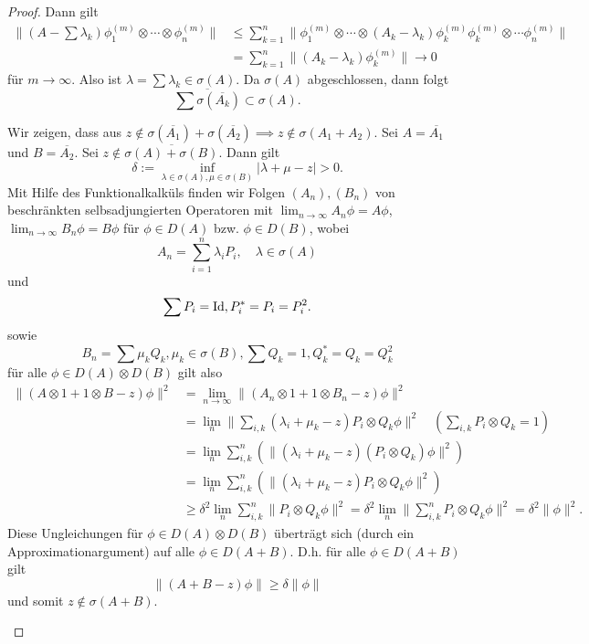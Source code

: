 \documentclass{mycourse}
\begin{document}
\begin{proof}
Dann gilt \fixme
\begin{align*}
\|(A- \sum \lambda_k)  \phi_1^{(m)} \otimes  \cdots \otimes \phi_n^{(m)}\| &\le \sum_{k=1}^n \| \phi_1^{(m)} \otimes \cdots \otimes (A_k-\lambda_k) \phi_k^{(m)} \phi_k^{(m)} \otimes \cdots \phi_n^{(m)}\|\\
&= \sum_{k=1}^n \| (A_k - \lambda_k) \phi^{(m)}_k \| \to 0
\end{align*}
für $m\to \infty$. Also ist $\lambda = \sum \lambda_k \in \sigma(A)$. Da $\sigma(A)$ abgeschlossen, dann folgt
\[
\overline{\sum \sigma (\overline{A_k})} \subset \sigma(A).
\] 
\begin{seg}[Umkehrung für $n=2$]
Wir zeigen, dass aus $z\not\in \sigma(\overline{A_1}) + \sigma(\overline{A_2}) \implies z\not\in \sigma(A_1 + A_2)$. Sei $A= \overline{A_1}$ und $B= \overline{A_2}$. Sei $z\not\in \overline{\sigma(A) + \sigma(B)}$. Dann gilt
\[
\delta := \inf_{\lambda\in \sigma(A), \mu \in \sigma(B)} |\lambda + \mu -z|>0.
\]
Mit Hilfe des Funktionalkalküls finden wir Folgen $(A_n), (B_n)$ von beschränkten selbsadjungierten Operatoren mit $\lim_{n\to \infty} A_n \phi = A \phi$, $\lim_{n\to \infty} B_n \phi = B\phi$ für $\phi \in D(A)$ bzw. $\phi \in D(B)$, wobei
\[
A_n = \sum_{i=1}^n \lambda_i P_i, \quad \lambda \in \sigma(A)
\]
und
\[
\sum P_i = \operatorname{Id}, P_i^* = P_i = P_i^2.
\]
sowie
\[
B_n = \sum \mu_k Q_k, \mu_k \in \sigma(B), \sum Q_k =1, Q_k^* = Q_k = Q_k^2
\]
für alle $\phi \in D(A) \otimes D(B)$ gilt also
\begin{align*}
\| (A \otimes 1 + 1 \otimes B - z) \phi \|^2 &= \lim_{n\to \infty} \| (A_n \otimes 1 + 1 \otimes B_n -z) \phi\|^2 \\
&= \lim_{n} \| \sum_{i,k} (\lambda_i + \mu_k -z)  P_i \otimes Q_k \phi \|^2 \quad (\sum_{i,k} P_i \otimes Q_k =1)\\
&= \lim_{n} \sum_{i,k}^n ( \| (\lambda_i+ \mu_k -z) (P_i \otimes Q_k) \phi\|^2)\\
&= \lim_{n} \sum_{i,k}^n ( \|(\lambda_i + \mu_k-z) P_i \otimes Q_k \phi\|^2)\\
&\ge \delta^2 \lim_{n} \sum_{i,k}^n \|P_i \otimes Q_k \phi \|^2 = \delta^2 \lim_{n} \| \sum_{i,k}^n P_i \otimes Q_k \phi \|^2 = \delta^2 \|\phi \|^2.
\end{align*}
Diese Ungleichungen für $\phi \in D(A) \otimes D(B)$ überträgt sich (durch ein Approximationargument) auf alle $\phi \in D(A+B)$. D.h. für alle $\phi \in D(A+B)$ gilt
\[
\|(A+B-z) \phi \| \ge \delta \| \phi \|
\]
und somit $z\not\in \sigma(A+B)$.
\end{seg} \fixme
\end{proof}
\end{document}
